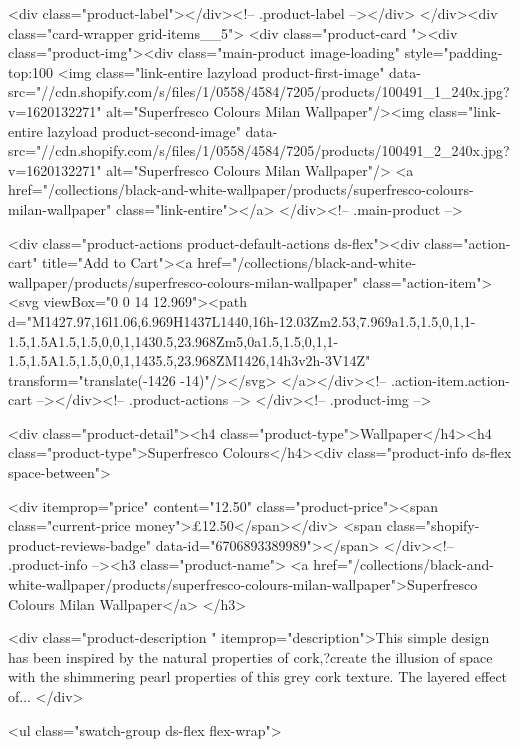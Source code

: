 {{{{{{{<div class="product-label"></div><!-- .product-label --></div>
          </div><div class="card-wrapper grid-items__5">
            <div class="product-card "><div class="product-img"><div class="main-product image-loading" style="padding-top:100%
      <img class="link-entire lazyload product-first-image" data-src="//cdn.shopify.com/s/files/1/0558/4584/7205/products/100491_1_240x.jpg?v=1620132271" alt="Superfresco Colours Milan Wallpaper"/><img class="link-entire lazyload product-second-image" data-src="//cdn.shopify.com/s/files/1/0558/4584/7205/products/100491_2_240x.jpg?v=1620132271" alt="Superfresco Colours Milan Wallpaper"/>
      <a href="/collections/black-and-white-wallpaper/products/superfresco-colours-milan-wallpaper" class="link-entire"></a>
    </div><!-- .main-product -->
  
<div class="product-actions product-default-actions ds-flex"><div class="action-cart" title="Add to Cart"><a href="/collections/black-and-white-wallpaper/products/superfresco-colours-milan-wallpaper" class="action-item"><svg viewBox="0 0 14 12.969"><path d="M1427.97,16l1.06,6.969H1437L1440,16h-12.03Zm2.53,7.969a1.5,1.5,0,1,1-1.5,1.5A1.5,1.5,0,0,1,1430.5,23.968Zm5,0a1.5,1.5,0,1,1-1.5,1.5A1.5,1.5,0,0,1,1435.5,23.968ZM1426,14h3v2h-3V14Z" transform="translate(-1426 -14)"/></svg>
</a></div><!-- .action-item.action-cart --></div><!-- .product-actions -->
</div><!-- .product-img -->

<div class="product-detail"><h4 class="product-type">Wallpaper</h4><h4 class="product-type">Superfresco Colours</h4><div class="product-info ds-flex space-between">
    
<div itemprop="price" content="12.50" class="product-price"><span class="current-price money">£12.50</span></div>
    <span class="shopify-product-reviews-badge" data-id="6706893389989"></span>
  </div><!-- .product-info --><h3 class="product-name">
      <a href="/collections/black-and-white-wallpaper/products/superfresco-colours-milan-wallpaper">Superfresco Colours Milan Wallpaper</a>
    </h3>
    
<div class="product-description " itemprop="description">This simple design has been inspired by the natural properties of cork,?create the illusion of space with the shimmering pearl properties of this grey cork texture. The layered effect of...
</div>



<ul class="swatch-group ds-flex flex-wrap">
        
}}}}}}}

